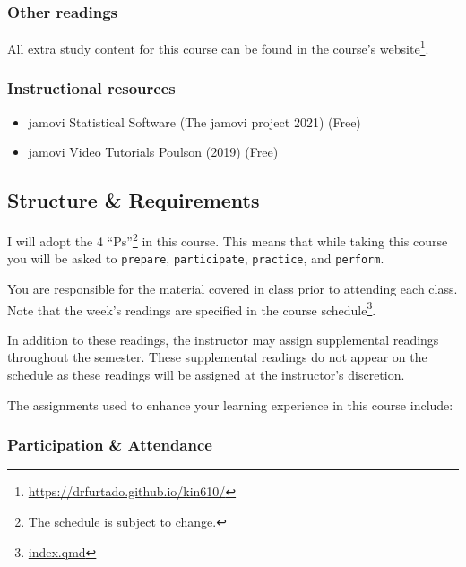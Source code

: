 \documentclass[
  letterpaper,
  DIV=11,
  numbers=noendperiod]{scrartcl}
\providecommand{\tightlist}{%
  \setlength{\itemsep}{0pt}\setlength{\parskip}{0pt}}\usepackage{longtable,booktabs,array}
\DeclareRobustCommand{\href}[2]{#2\footnote{\url{#1}}}
\begin{document}
\hypertarget{other-readings}{%
\subsubsection{Other readings}\label{other-readings}}

All extra study content for this course can be found in the
\href{https://drfurtado.github.io/kin610/}{course's website}.

\hypertarget{instructional-resources}{%
\subsubsection{Instructional resources}\label{instructional-resources}}

\begin{itemize}
\tightlist
\item
  jamovi Statistical Software (The jamovi project 2021) (Free)
\item
  jamovi Video Tutorials Poulson (2019) (Free)
\end{itemize}

\hypertarget{sec-structure-requirements}{%
\subsection{Structure \&
Requirements}\label{sec-structure-requirements}}

I will adopt the 4 ``Ps''\footnote{The schedule is subject to change.}
in this course. This means that while taking this course you will be
asked to \texttt{prepare}, \texttt{participate}, \texttt{practice}, and
\texttt{perform}.

You are responsible for the material covered in class prior to attending
each class. Note that the week's readings are specified in the
\href{index.qmd}{course schedule}.

In addition to these readings, the instructor may assign supplemental
readings throughout the semester. These supplemental readings do not
appear on the schedule as these readings will be assigned at the
instructor's discretion.

The assignments used to enhance your learning experience in this course
include:

\hypertarget{sec-participation-attendance}{%
\subsubsection{Participation \&
Attendance}\label{sec-participation-attendance}}
\end{document}
